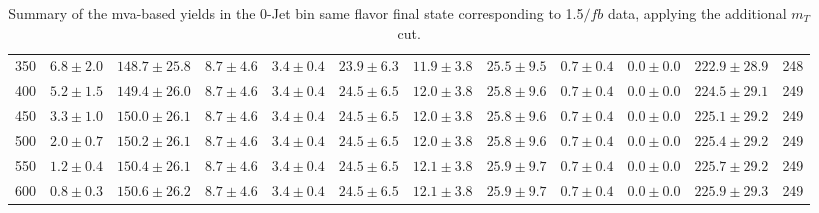 \begin{table}
{\begin{center}
\begin{tabular}{l c c c c c c c c c c c }
350 & $6.8\pm2.0$ & $148.7\pm25.8$ & $8.7\pm4.6$ & $3.4\pm0.4$ & $23.9\pm6.3$ & $11.9\pm3.8$ & $25.5\pm9.5$ & $0.7\pm0.4$ & $0.0\pm0.0$ & $222.9\pm28.9$ & 248 \\
400 & $5.2\pm1.5$ & $149.4\pm26.0$ & $8.7\pm4.6$ & $3.4\pm0.4$ & $24.5\pm6.5$ & $12.0\pm3.8$ & $25.8\pm9.6$ & $0.7\pm0.4$ & $0.0\pm0.0$ & $224.5\pm29.1$ & 249 \\
450 & $3.3\pm1.0$ & $150.0\pm26.1$ & $8.7\pm4.6$ & $3.4\pm0.4$ & $24.5\pm6.5$ & $12.0\pm3.8$ & $25.8\pm9.6$ & $0.7\pm0.4$ & $0.0\pm0.0$ & $225.1\pm29.2$ & 249 \\
500 & $2.0\pm0.7$ & $150.2\pm26.1$ & $8.7\pm4.6$ & $3.4\pm0.4$ & $24.5\pm6.5$ & $12.0\pm3.8$ & $25.8\pm9.6$ & $0.7\pm0.4$ & $0.0\pm0.0$ & $225.4\pm29.2$ & 249 \\
550 & $1.2\pm0.4$ & $150.4\pm26.1$ & $8.7\pm4.6$ & $3.4\pm0.4$ & $24.5\pm6.5$ & $12.1\pm3.8$ & $25.9\pm9.7$ & $0.7\pm0.4$ & $0.0\pm0.0$ & $225.7\pm29.2$ & 249 \\
600 & $0.8\pm0.3$ & $150.6\pm26.2$ & $8.7\pm4.6$ & $3.4\pm0.4$ & $24.5\pm6.5$ & $12.1\pm3.8$ & $25.9\pm9.7$ & $0.7\pm0.4$ & $0.0\pm0.0$ & $225.9\pm29.3$ & 249 \\
\hline
\end{tabular}
\end{center}
}
\caption{Summary of the mva-based yields in the 0-Jet bin same flavor final state corresponding to 1.5$/fb$ data, applying the additional $m_T$ cut.}
\end{table}
